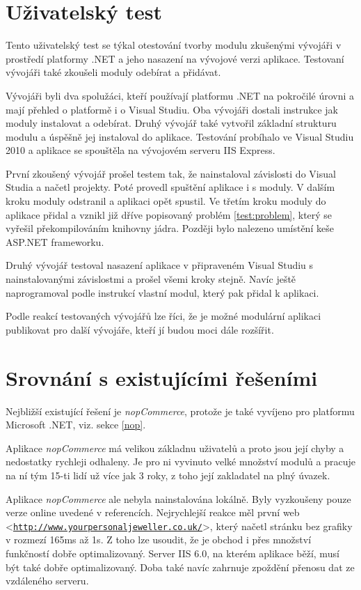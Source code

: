 \documentclass[11pt,twoside,a4paper]{book}
\let\oldUrl\url
\renewcommand\url[1]{<\texttt{\oldUrl{#1}}>}
\begin{document}
\section{Uživatelský test}
Tento uživatelský test se týkal otestování tvorby modulu zkušenými vývojáři v prostředí platformy .NET a jeho nasazení na vývojové verzi aplikace. Testovaní vývojáři také zkoušeli moduly odebírat a přidávat.

Vývojáři byli dva spolužáci, kteří používají platformu .NET na pokročilé úrovni a mají přehled o platformě i o Visual Studiu. Oba vývojáři dostali instrukce jak moduly instalovat a odebírat. Druhý vývojář také vytvořil základní strukturu modulu a úspěšně jej instaloval do aplikace. Testování probíhalo ve Visual Studiu 2010 a aplikace se spouštěla na vývojovém serveru IIS Express.

První zkoušený vývojář prošel testem tak, že nainstaloval závislosti do Visual Studia a načetl projekty. Poté provedl spuštění aplikace i s moduly. V dalším kroku moduly odstranil a aplikaci opět spustil. Ve třetím kroku moduly do aplikace přidal a vznikl již dříve popisovaný problém \ref{test:problem}, který se vyřešil překompilováním knihovny jádra. Později bylo nalezeno umístění keše ASP.NET frameworku.

Druhý vývojář testoval nasazení aplikace v připraveném Visual Studiu s nainstalovanými závislostmi a prošel všemi kroky stejně. Navíc ještě naprogramoval podle instrukcí vlastní modul, který pak přidal k aplikaci.

Podle reakcí testovaných vývojářů lze říci, že je možné modulární aplikaci publikovat pro další vývojáře, kteří jí budou moci dále rozšířit.


\section{Srovnání s existujícími řešeními}

Nejbližší existující řešení je \textit{nopCommerce}, protože je také vyvíjeno pro platformu Microsoft .NET, viz. sekce \ref{nop}. 

Aplikace \textit{nopCommerce} má velikou základnu uživatelů a proto jsou její chyby a nedostatky rychleji odhaleny. Je pro ni vyvinuto velké množství modulů a pracuje na ní tým 15-ti lidí už více jak 3 roky, z toho její zakladatel na plný úvazek.

Aplikace \textit{nopCommerce} ale nebyla nainstalována lokálně. Byly vyzkoušeny pouze verze online uvedené v referencích. Nejrychlejší reakce měl první web \\ \url{http://www.yourpersonaljeweller.co.uk/}, který načetl stránku bez grafiky v rozmezí 165ms až 1s. Z toho lze usoudit, že je obchod i přes množství funkčností dobře optimalizovaný. Server IIS 6.0, na kterém aplikace běží, musí být také dobře optimalizovaný. Doba také navíc zahrnuje zpoždění přenosu dat ze vzdáleného serveru.
\end{document}
